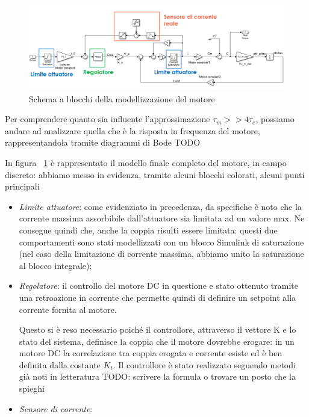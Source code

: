 \begin{figure}[H]
	\centering   	
	\includegraphics[width=1\textwidth]{Immagini/motor_discrete_model.png}
	\caption{Schema a blocchi della modellizzazione del motore}
	\label{fig:motor}
\end{figure}

Per comprendere quanto sia influente l'approssimazione $\tau_m >> 4\tau_e$, possiamo andare ad analizzare quella che è la risposta in frequenza del motore, rappresentandola tramite diagrammi di Bode 
TODO


In figura ~\ref{fig:motor} è rappresentato il modello finale completo del motore, in campo discreto: abbiamo messo in evidenza, tramite alcuni blocchi colorati, alcuni punti principali
\begin{itemize}
	\item \textit{Limite attuatore}: come evidenziato in precedenza, da specifiche è noto che la corrente massima assorbibile dall'attuatore sia limitata ad un valore max. Ne consegue quindi che, anche la coppia risulti essere limitata: questi due comportamenti sono stati modellizzati con un blocco Simulink di saturazione (nel caso della limitazione di corrente massima, abbiamo unito la saturazione al blocco integrale);
	\item \textit{Regolatore}: il controllo del motore DC in questione e stato ottenuto tramite una retroazione in corrente che permette quindi di definire un setpoint alla corrente fornita al motore.
	
	Questo si è reso necessario poiché il controllore, attraverso il vettore K e lo stato del sistema, definisce la coppia che il motore dovrebbe erogare: in un motore DC la correlazione tra coppia erogata e corrente esiste ed è ben definita dalla costante $K_t$.
	Il controllore è stato realizzato seguendo metodi già noti in letteratura TODO: scrivere la formula o trovare un posto che la spieghi 
	\item \textit{Sensore di corrente}:
\end{itemize}